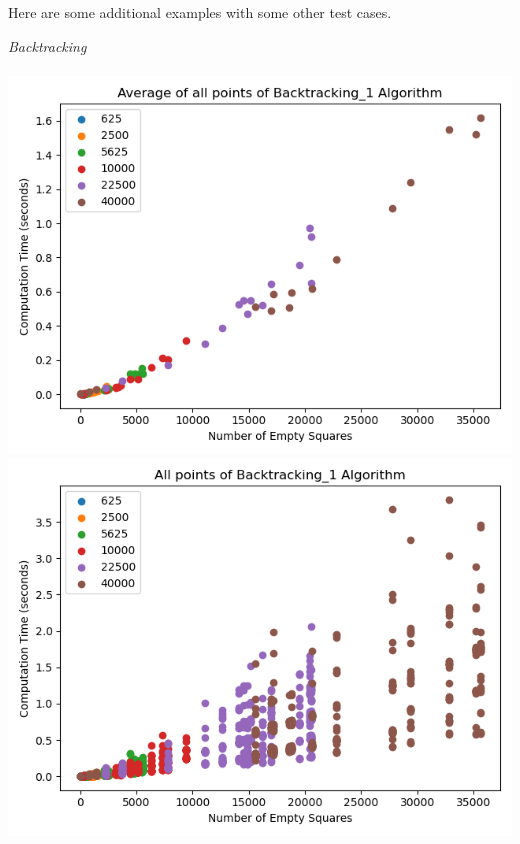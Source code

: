 \documentclass{article}
\begin{document}
\bigskip

Here are some additional examples with some other test cases.

\noindent \textit{Backtracking} \\ \\
\includegraphics[scale=0.5]{scatter_avg_Backtracking_1-2.png}
\includegraphics[scale=0.5]{scatter_Backtracking_1-2.png}

\bigskip
\end{document}
